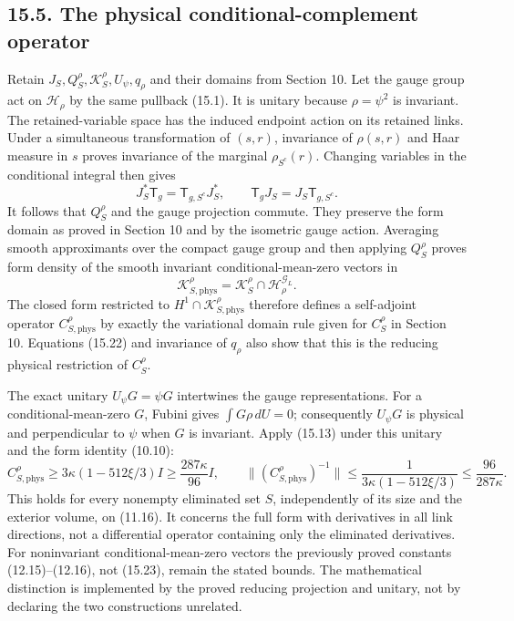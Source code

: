 \documentclass[
]{article}
\begin{document}
\subsection{15.5. The physical conditional-complement
operator}\label{the-physical-conditional-complement-operator}

Retain \(J_S,Q_S^\rho,\mathscr K_S^\rho,U_\psi,q_\rho\) and their
domains from Section 10. Let the gauge group act on \(\mathscr H_\rho\)
by the same pullback (15.1). It is unitary because \(\rho=\psi^2\) is
invariant. The retained-variable space has the induced endpoint action
on its retained links. Under a simultaneous transformation of \((s,r)\),
invariance of \(\rho(s,r)\) and Haar measure in \(s\) proves invariance
of the marginal \(\rho_{S^c}(r)\). Changing variables in the conditional
integral then gives \[
J_S^*\mathsf T_g=\mathsf T_{g,S^c}J_S^*,\qquad
\mathsf T_gJ_S=J_S\mathsf T_{g,S^c}.                          \tag{15.22}
\] It follows that \(Q_S^\rho\) and the gauge projection commute. They
preserve the form domain as proved in Section 10 and by the isometric
gauge action. Averaging smooth approximants over the compact gauge group
and then applying \(Q_S^\rho\) proves form density of the smooth
invariant conditional-mean-zero vectors in \[
\mathscr K_{S,\mathrm{phys}}^\rho
 =\mathscr K_S^\rho\cap\mathscr H_\rho^{\mathcal G_L}.
\] The closed form restricted to
\(H^1\cap\mathscr K_{S,\mathrm{phys}}^\rho\) therefore defines a
self-adjoint operator \(C_{S,\mathrm{phys}}^\rho\) by exactly the
variational domain rule given for \(C_S^\rho\) in Section 10. Equations
(15.22) and invariance of \(q_\rho\) also show that this is the reducing
physical restriction of \(C_S^\rho\).

The exact unitary \(U_\psi G=\psi G\) intertwines the gauge
representations. For a conditional-mean-zero \(G\), Fubini gives
\(\int G\rho\,dU=0\); consequently \(U_\psi G\) is physical and
perpendicular to \(\psi\) when \(G\) is invariant. Apply (15.13) under
this unitary and the form identity (10.10): \[
C_{S,\mathrm{phys}}^\rho
 \ge3\kappa(1-512\xi/3)I\ge\frac{287\kappa}{96}I,
\qquad
\|(C_{S,\mathrm{phys}}^\rho)^{-1}\|
 \le\frac1{3\kappa(1-512\xi/3)}
 \le\frac{96}{287\kappa}.                                    \tag{15.23}
\] This holds for every nonempty eliminated set \(S\), independently of
its size and the exterior volume, on (11.16). It concerns the full form
with derivatives in all link directions, not a differential operator
containing only the eliminated derivatives. For noninvariant
conditional-mean-zero vectors the previously proved constants
(12.15)--(12.16), not (15.23), remain the stated bounds. The
mathematical distinction is implemented by the proved reducing
projection and unitary, not by declaring the two constructions
unrelated.
\end{document}
